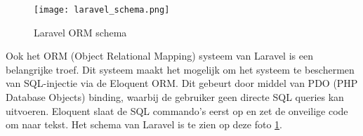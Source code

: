 \begin{figure}
    \centering
    \texttt{[image: laravel\_schema.png]}
    \caption[Laravel ORM schema]{Laravel ORM schema ~\autocite{2020}}
    \label{fig:laravel_schema}
\end{figure}

Ook het ORM (Object Relational Mapping) systeem van Laravel is een belangrijke troef. Dit systeem maakt het mogelijk om 
het systeem te beschermen van SQL-injectie via de Eloquent ORM. Dit gebeurt door middel van PDO (PHP Database Objects) binding, waarbij de
gebruiker geen directe SQL queries kan uitvoeren. Eloquent slaat de SQL commando's eerst op en zet de onveilige code om 
naar tekst. Het schema van Laravel is te zien op deze foto \ref{fig:laravel_schema}.
